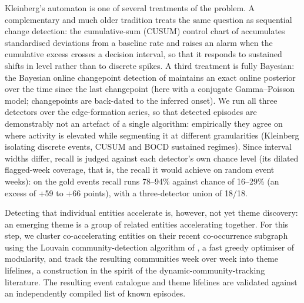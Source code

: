 \documentclass[a4paper,12pt]{report}
\begin{document}
Kleinberg's automaton is one of several treatments of the problem. A complementary and
much older tradition treats the same question as sequential change
detection: the cumulative-sum (CUSUM) control chart of \citet{Page1954CUSUM}
accumulates standardised deviations from a baseline rate and raises an alarm
when the cumulative excess crosses a decision interval, so that it responds to
sustained shifts in level rather than to discrete spikes. A third treatment is fully Bayesian:
the Bayesian online changepoint detection of \citet{AdamsMacKay2007BOCD}
maintains an exact online posterior over the time since the last changepoint
(here with a conjugate Gamma--Poisson model; changepoints are back-dated to
the inferred onset).
We run all three detectors over the edge-formation series, so
that detected episodes are demonstrably not an artefact of a single algorithm:
empirically they agree on where activity is elevated while segmenting it at
different granularities (Kleinberg isolating discrete events, CUSUM and BOCD
sustained regimes). Since interval widths differ, recall is judged against
each detector's own chance level (its dilated flagged-week coverage, that is,
the recall it would achieve on random event weeks): on the gold events recall runs
78--94\% against chance of 16--29\% (an excess of +59 to +66 points), with a
three-detector union of 18/18.

Detecting that individual entities accelerate is, however, not yet theme
discovery: an emerging theme is a group of related entities accelerating
together. For this step, we cluster co-accelerating entities on
their recent co-occurrence subgraph using the Louvain community-detection
algorithm of \citet{Blondel2008Louvain}, a fast greedy optimiser of modularity,
and track the resulting communities week over week into theme lifelines,
a construction in the spirit of the dynamic-community-tracking literature.
The resulting event catalogue and theme lifelines are validated against an
independently compiled list of known episodes.
\end{document}
